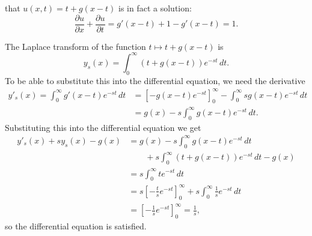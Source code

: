 \begin{loesung}
\begin{teilaufgaben}
that $u(x,t)=t+g(x-t)$ is in fact a solution:
\[
\frac{\partial u}{\partial x}+\frac{\partial u}{\partial t}
=
g'(x-t)+1-g'(x-t)=1.
\]
\item
The Laplace transform of the function $t\mapsto t+g(x-t)$ is
\[
y_s(x)=\int_0^\infty (t+g(x-t))e^{-st}\,dt.
\]
To be able to substitute this into the differential equation, we
need the derivative
\begin{align*}
y'_s(x)=\int_0^\infty g'(x-t)e^{-st}\,dt
&=\left[-g(x-t)e^{-st}\right]_0^\infty
-\int_0^\infty sg(x-t)e^{-st}\,dt
\\
&=g(x)-s\int_0^\infty g(x-t) e^{-st}\,dt.
\end{align*}
Substituting this into the differential equation we get
\begin{align*}
y'_s(x)+sy_s(x)-g(x)&=g(x)-s\int_0^\infty g(x-t)e^{-st}\,dt
\\
&\qquad
+s\int_0^\infty (t+g(x-t)) e^{-st}\,dt-g(x)
\\
&=s\int_0^\infty te^{-st}\,dt
\\
&=s\left[-\frac{t}{s}e^{-st}\right]_0^\infty
+s\int_0^\infty\frac{1}{s}e^{-st}\,dt
\\
&=\left[-\frac1s e^{-st}\right]_0^\infty
=\frac1s,
\end{align*}
so the differential equation is satisfied.
\qedhere
\end{teilaufgaben}
\end{loesung}
